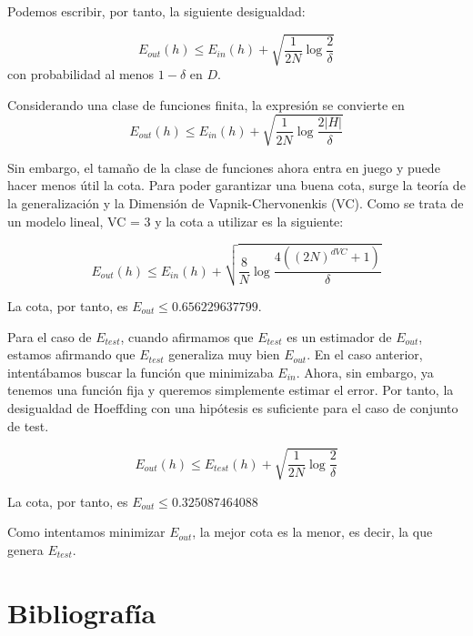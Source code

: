 \begin{itemize}
	Podemos escribir, por tanto, la siguiente desigualdad:
	
	$$E_{out}(h) \leq E_{in}(h) + \sqrt{\frac{1}{2N} \log \frac{2}{\delta}}$$
	con probabilidad al menos $1-\delta$ en $D$.
	
	Considerando una clase de funciones finita, la expresión se convierte en 
	$$E_{out}(h) \leq E_{in}(h) + \sqrt{\frac{1}{2N} \log \frac{2|H|}{\delta}}$$
	
	Sin embargo, el tamaño de la clase de funciones ahora entra en juego y puede hacer menos útil la cota. Para poder garantizar una buena cota, surge la teoría de la generalización y la Dimensión de Vapnik-Chervonenkis (VC). Como se trata de un modelo lineal, VC = 3 y la cota a utilizar es la siguiente:
	
	$$E_{out}(h) \leq E_{in}(h) + \sqrt{\frac{8}{N} \log \frac{4((2N)^{d {VC}}+1)}{\delta}}$$
	
	La cota, por tanto, es $E_{out} \leq 0.656229637799$.
	
	Para el caso de $E_{test}$, cuando afirmamos que $E_{test}$ es un estimador de $E_{out}$, estamos afirmando que $E_{test}$ generaliza muy bien $E_{out}$. En el caso anterior, intentábamos buscar la función que minimizaba $E_{in}$. Ahora, sin embargo, ya tenemos una función fija y queremos simplemente estimar el error. Por tanto, la desigualdad de Hoeffding con una hipótesis es suficiente para el caso de conjunto de test. 
	
	$$E_{out}(h) \leq E_{test}(h) + \sqrt{\frac{1}{2N} \log \frac{2}{\delta}}$$
	
	La cota, por tanto, es $E_{out} \leq 0.325087464088$
	
	Como intentamos minimizar $E_{out}$, la mejor cota es la menor, es decir, la que genera $E_{test}$.
\end{itemize}

\newpage
\section{Bibliografía}




